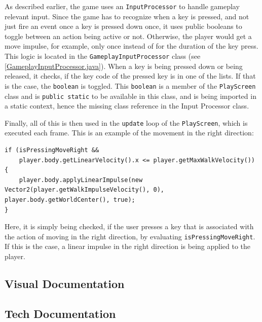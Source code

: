 \documentclass[12p]{article}
\begin{document}
As described earlier, the game uses an \texttt{InputProcessor} to handle gameplay relevant input. Since the game has to recognize when a key is pressed, and not just fire an event once a key is pressed down once, it uses public booleans to toggle between an action being active or not. Otherwise, the player would get a move impulse, for example, only once instead of for the duration of the key press. This logic is located in the \texttt{GameplayInputProcessor} class (see \ref{GameplayInputProcessor.java}). When a key is being pressed down or being released, it checks, if the key code of the pressed key is in one of the lists. If that is the case, the \texttt{boolean} is toggled. This \texttt{boolean} is a member of the \texttt{PlayScreen} class and is \texttt{public static} to be available in this class, and is being imported in a static context, hence the missing class reference in the Input Processor class.

Finally, all of this is then used in the \texttt{update} loop of the \texttt{PlayScreen}, which is executed each frame. This is an example of the movement in the right direction:

\begin{verbatim}
if (isPressingMoveRight &&
    player.body.getLinearVelocity().x <= player.getMaxWalkVelocity()) 
{
    player.body.applyLinearImpulse(new Vector2(player.getWalkImpulseVelocity(), 0), player.body.getWorldCenter(), true);
}
\end{verbatim}

Here, it is simply being checked, if the user presses a key that is associated with the action of moving in the right direction, by evaluating \texttt{isPressingMoveRight}. If this is the case, a linear impulse in the right direction is being applied to the player.


\subsection{Visual Documentation} \label{DocVisual}


\subsection{Tech Documentation} \label{DocTech}

\end{document}
